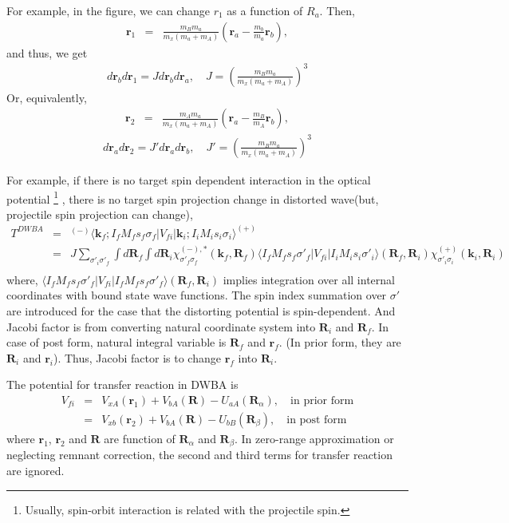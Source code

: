 \documentclass[11pt]{book}
\def\bm{\boldsymbol}
\def\vk{{\bm k}}
\def\vr{{\bm r}}
\def\vR{{\bm R}}
\def\la{\langle}
\def\ra{\rangle}
\newcommand{\bea}{\begin{eqnarray}}
\newcommand{\eea}{\end{eqnarray}}
\newcommand{\no}{\nonumber \\}
\begin{document}
For example, in the figure, we can change $r_1$ as a function of $R_a$. 
Then, 
\bea 
\vr_1&=&\frac{m_B m_a}{m_x(m_a+m_A)}(\vr_a-\frac{m_b}{m_a}\vr_b), 
\eea 
and thus, we get
\bea 
d\vr_b d\vr_1= J d\vr_b d\vr_a,\quad J=\left(\frac{m_B m_a}{m_x(m_a+m_A)}\right)^3
\eea 
Or, equivalently,
\bea 
\vr_2&=& \frac{m_A m_a}{m_x(m_a+m_A)}(\vr_a-\frac{m_B}{m_A}\vr_b),
\eea 
\bea 
d\vr_a d\vr_2 = J' d\vr_a d\vr_b,\quad J' =\left( \frac{m_B m_a}{m_x(m_a+m_A)}\right)^3  
\eea 

For example, if there is no target spin dependent interaction in the optical potential
\footnote{
Usually, spin-orbit interaction is related with the projectile spin.
} , there is no target spin projection change in distorted wave(but, projectile spin projection
can change), 
\bea 
T^{DWBA}&=&{}^{(-)}\la \vk_f; I_f M_f s_f \sigma_f|V_{fi}|\vk_i;I_i M_i s_i \sigma_i\ra^{(+)} \no 
&=&J \sum_{\sigma'_i\sigma'_f} \int d {\bm R}_f \int d{\bm R}_i
     \chi^{(-),*}_{\sigma'_f \sigma_f}(\vk_f,{\bm R}_f)
     \la I_f M_f s_f \sigma'_f|V_{fi}|I_i M_i s_i \sigma'_i\ra({\bm R}_f,{\bm R}_i)
     \chi^{(+)}_{\sigma'_i \sigma_i}(\vk_i,{\bm R}_i)  \no 
\eea 
where, $\la I_f M_f s_f \sigma'_f|V_{fi}|I_f M_f s_f \sigma'_f\ra({\bm R}_f,{\bm R}_i)$
implies integration over all internal coordinates with bound state wave functions. 
The spin index summation over $\sigma'$ are introduced for the case that 
the distorting potential is spin-dependent. 
And Jacobi factor is from converting natural coordinate system into ${\bm R}_i$ and ${\bm R}_f$.
In case of post form, natural integral variable is ${\bm R}_f$ and ${\bm r}_f$.
(In prior form, they are ${\bm R}_i$ and ${\bm r}_i$). Thus, Jacobi factor is to 
change ${\bm r}_f$ into ${\bm R}_i$.

The potential for transfer reaction in DWBA is
\bea 
V_{fi} &=& V_{xA}(\vr_1) +V_{bA}(\vR) -U_{aA}(\vR_\alpha) ,\quad \mbox{in prior form}\no  
       &=& V_{xb}(\vr_2) +V_{bA}(\vR) -U_{bB}(\vR_\beta),\quad \mbox{in post form}   
\eea 
where $\vr_1$, $\vr_2$ and $\vR$ are function of $\vR_\alpha$ and $\vR_\beta$.
In zero-range approximation or neglecting remnant correction, 
the second and third terms for transfer reaction are ignored. 
\end{document}
